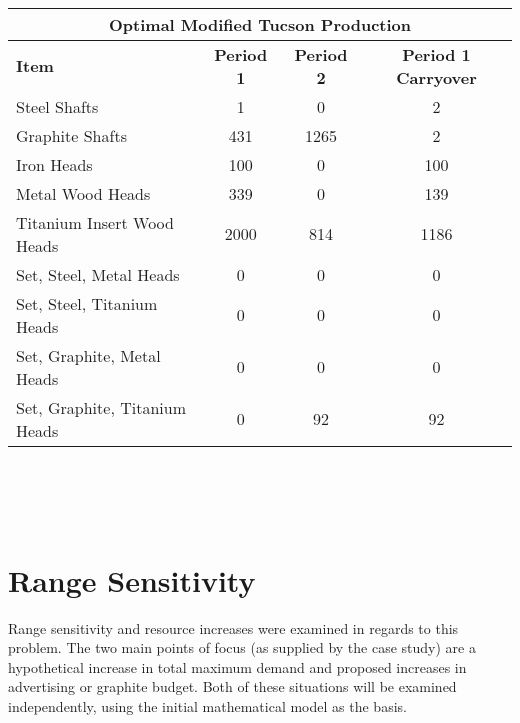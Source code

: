 \documentclass{article}
\begin{document}
\vspace{5mm}
\\
\noindent
\begin{tabular}{ l c c c }
\hline
\multicolumn{4}{|c|}{Optimal Modified Tucson Production} \\
\hline
\textbf{Item} & \textbf{Period 1} & \textbf{Period 2} & \textbf{Period 1 Carryover} \\
Steel Shafts & 1 & 0 & 2 \\
Graphite Shafts & 431 & 1265 & 2 \\
Iron Heads & 100 & 0 & 100 \\
Metal Wood Heads & 339 & 0 & 139 \\
Titanium Insert Wood Heads & 2000 & 814 & 1186 \\
Set, Steel, Metal Heads & 0 & 0 & 0 \\
Set, Steel, Titanium Heads & 0 & 0 & 0 \\
Set, Graphite, Metal Heads & 0 & 0 & 0 \\
Set, Graphite, Titanium Heads & 0 & 92 & 92\\
\end{tabular}
\\
\\
\vspace{5mm}
\\

\section{Range Sensitivity}
Range sensitivity and resource increases were examined in regards to this problem.  The two main points of focus (as supplied by the case study) are a hypothetical increase in total maximum demand and proposed increases in advertising or graphite budget.  Both of these situations 
will be examined independently, using the initial mathematical model as the basis.
\end{document}
